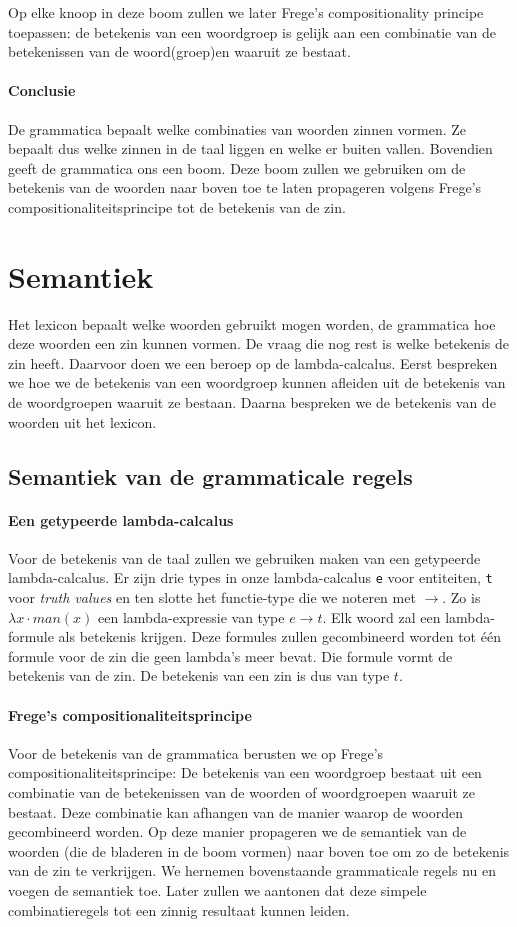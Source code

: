 Op elke knoop in deze boom zullen we later Frege's compositionality principe toepassen: de betekenis van een woordgroep is gelijk aan een combinatie van de betekenissen van de woord(groep)en waaruit ze bestaat.

\paragraph{Conclusie} De grammatica bepaalt welke combinaties van woorden zinnen vormen. Ze bepaalt dus welke zinnen in de taal liggen en welke er buiten vallen. Bovendien geeft de grammatica ons een boom. Deze boom zullen we gebruiken om de betekenis van de woorden naar boven toe te laten propageren volgens Frege's compositionaliteitsprincipe tot de betekenis van de zin.

\section{Semantiek}
Het lexicon bepaalt welke woorden gebruikt mogen worden, de grammatica hoe deze woorden een zin kunnen vormen. De vraag die nog rest is welke betekenis de zin heeft. Daarvoor doen we een beroep op de lambda-calcalus. Eerst bespreken we hoe we de betekenis van een woordgroep kunnen afleiden uit de betekenis van de woordgroepen waaruit ze bestaan. Daarna bespreken we de betekenis van de woorden uit het lexicon.

\subsection{Semantiek van de grammaticale regels}
\paragraph{Een getypeerde lambda-calcalus}
Voor de betekenis van de taal zullen we gebruiken maken van een getypeerde lambda-calcalus. Er zijn drie types in onze lambda-calcalus \texttt{e} voor entiteiten, \texttt{t} voor \textit{truth values} en ten slotte het functie-type die we noteren met $\rightarrow$. Zo is $\lambda x \cdot man(x)$ een lambda-expressie van type $e \rightarrow t$. Elk woord zal een lambda-formule als betekenis krijgen. Deze formules zullen gecombineerd worden tot één formule voor de zin die geen lambda's meer bevat. Die formule vormt de betekenis van de zin. De betekenis van een zin is dus van type $t$.

\paragraph{Frege's compositionaliteitsprincipe} Voor de betekenis van de grammatica berusten we op Frege's compositionaliteitsprincipe: De betekenis van een woordgroep bestaat uit een combinatie van de betekenissen van de woorden of woordgroepen waaruit ze bestaat. Deze combinatie kan afhangen van de manier waarop de woorden gecombineerd worden. Op deze manier propageren we de semantiek van de woorden (die de bladeren in de boom vormen) naar boven toe om zo de betekenis van de zin te verkrijgen. We hernemen bovenstaande grammaticale regels nu en voegen de semantiek toe. Later zullen we aantonen dat deze simpele combinatieregels tot een zinnig resultaat kunnen leiden.

